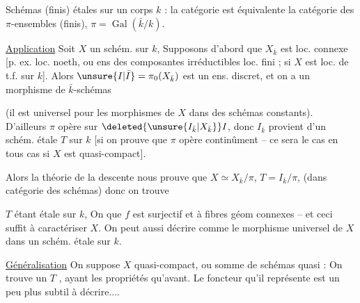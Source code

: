 Schémas (finis) étales sur un corps $k$ : la catégorie est équivalente  la catégorie des $\pi$-ensembles (finis), $\pi=\operatorname{Gal}(\bar k/k)$.

\uline{Application} Soit $X$ un schém. sur $k$, Supposons d'abord que $X_{\bar k}$ est loc. connexe [p. ex. loc. noeth, ou ens des composantes irréductibles loc. fini ;  si $X$ est loc. de t.f. sur $k$]. Alors $\unsure{I|\bar I}=\pi_0(X_{\bar k})$ est un ens. discret, et on a un  morphisme de $\bar k$-schémas

(il est universel pour les morphismes de $X$ dans des schémas constants). D'ailleurs $\pi$ opère sur $\deleted{\unsure{I_{\bar k}|X_{\bar k}}} I$, donc $I_{\bar k}$ provient d'un  schém. étale $T$ sur $k$ [si on prouve que $\pi$ opère continûment -- ce sera le cas en tous cas si $X$ est quasi-compact].


Alors la théorie de la descente nous prouve que $X\simeq X_{\bar k}/\pi$, $T=I_{\bar k}/\pi$, (dans catégorie des schémas) donc on trouve

$T$ étant étale sur $k$,  On  que $f$ est surjectif et à fibres géom connexes -- et ceci suffit à caractériser $X$. On peut aussi décrire comme le morphisme universel de $X$ dans un schém. étale sur $k$.


\uline{Généralisation} On suppose $X$ quasi-compact, ou somme de schémas quasi  : On trouve un $T$  , ayant les  propriétés\unsure{$\scriptscriptstyle\wedge$|,|$\scriptscriptstyle\times$} qu'avant. Le foncteur qu'il représente est un peu plus subtil à décrire....

